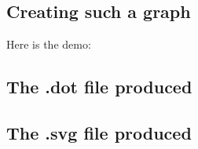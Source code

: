 \subsection{Creating such a graph}

Here is the demo:



\subsection{The .dot file produced}



\subsection{The .svg file produced}

